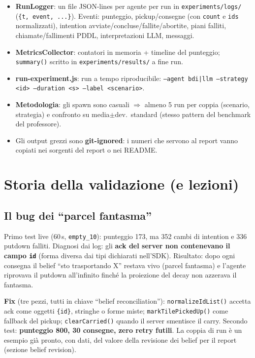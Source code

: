 \documentclass[11pt,a4paper]{article}
\newcommand{\file}[1]{\texttt{#1}}
\newcommand{\code}[1]{\texttt{#1}}
\begin{document}
\begin{itemize}
  \item \textbf{RunLogger}: un file JSON-lines per agente per run in
    \file{experiments/logs/} (\code{\{t, event, ...\}}). Eventi:
    punteggio, pickup/consegne (con \code{count} e \code{ids}
    normalizzati), intention avviate/concluse/fallite/abortite, piani
    falliti, chiamate/fallimenti PDDL, interpretazioni LLM, messaggi.
  \item \textbf{MetricsCollector}: contatori in memoria + timeline del
    punteggio; \code{summary()} scritto in \file{experiments/results/} a
    fine run.
  \item \textbf{run-experiment.js}: run a tempo riproducibile:
    \code{--agent bdi|llm --strategy <id> --duration <s> --label <scenario>}.
  \item \textbf{Metodologia}: gli spawn sono casuali $\Rightarrow$ almeno
    5 run per coppia (scenario, strategia) e confronto su media$\pm$dev.\
    standard (stesso pattern del benchmark del professore).
  \item Gli output grezzi sono \textbf{git-ignored}: i numeri che servono
    al report vanno copiati nei sorgenti del report o nei README.
\end{itemize}

\section{Storia della validazione (e lezioni)}\label{sec:bug-ack}

\subsection{Il bug dei ``parcel fantasma''}

Primo test live (60\,s, \code{empty\_10}): punteggio 173, ma 352 cambi di
intention e 336 putdown falliti. Diagnosi dai log: gli \textbf{ack del
server non contenevano il campo \code{id}} (forma diversa dai tipi
dichiarati nell'SDK). Risultato: dopo ogni consegna il belief ``sto
trasportando X'' restava vivo (parcel fantasma) e l'agente riprovava il
putdown all'infinito finché la proiezione del decay non azzerava il
fantasma.

\textbf{Fix} (tre pezzi, tutti in chiave ``belief reconciliation''):
\code{normalizeIdList()} accetta ack come oggetti \code{\{id\}}, stringhe
o forme miste; \code{markTilePickedUp()} come fallback del pickup;
\code{clearCarried()} quando il server smentisce il carry. Secondo test:
\textbf{punteggio 800, 30 consegne, zero retry futili}. La coppia di run è
un esempio già pronto, con dati, del valore della revisione dei belief per
il report (sezione belief revision).
\end{document}
